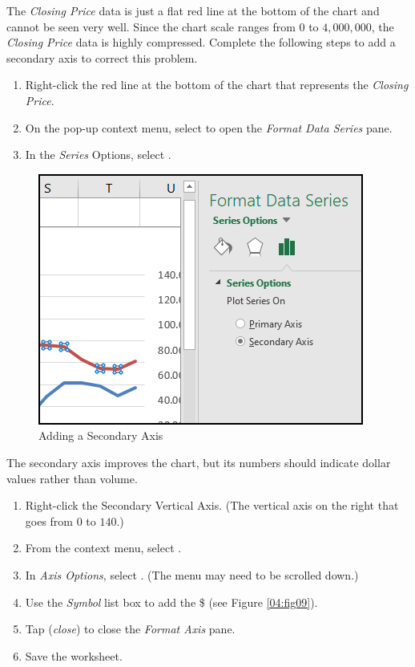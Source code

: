 The \textit{Closing Price} data is just a flat red line at the bottom of the chart and cannot be seen very well. Since the chart scale ranges from $ 0 $ to $ 4,000,000 $, the \textit{Closing Price} data is highly compressed. Complete the following steps to add a secondary axis to correct this problem.

\begin{enumbox}
	\begin{enumerate}
		\item Right-click the red line at the bottom of the chart that represents the \textit{Closing Price}.
		\item On the pop-up context menu, select  to open the \textit{Format Data Series} pane.
		\item In the \textit{Series} Options, select .
	\end{enumerate}
\end{enumbox}
	
\begin{figure}[H]
	\centering
	\includegraphics[width=\maxwidth{.75\linewidth}]{gfx/ch04_fig08}
	\caption{Adding a Secondary Axis}
	\label{04:fig08}
\end{figure}

The secondary axis improves the chart, but its numbers should indicate dollar values rather than volume.

\begin{enumbox}
	\begin{enumerate}
		\item Right-click the Secondary Vertical Axis. (The vertical axis on the right that goes from $ 0 $ to $ 140 $.)
		\item From the context menu, select .
		\item In \textit{Axis Options}, select . (The menu may need to be scrolled down.)
		\item Use the \textit{Symbol} list box to add the \$ (see Figure \ref{04:fig09}).
		\item Tap  (\textit{close}) to close the \textit{Format Axis} pane.
		\item Save the  worksheet.
	\end{enumerate}
\end{enumbox}
	
